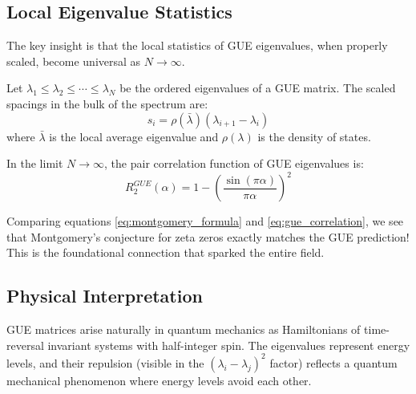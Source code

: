 \subsection{Local Eigenvalue Statistics}

The key insight is that the local statistics of GUE eigenvalues, when properly scaled, become universal as $N \to \infty$.

\begin{definition}
\label{def:scaled_spacings}
Let $\lambda_1 \leq \lambda_2 \leq \cdots \leq \lambda_N$ be the ordered eigenvalues of a GUE matrix. The scaled spacings in the bulk of the spectrum are:
\begin{equation}
s_i = \rho(\bar{\lambda}) (\lambda_{i+1} - \lambda_i)
\end{equation}
where $\bar{\lambda}$ is the local average eigenvalue and $\rho(\lambda)$ is the density of states.
\end{definition}

\begin{theorem}
\label{thm:gue_pair_correlation}
In the limit $N \to \infty$, the pair correlation function of GUE eigenvalues is:
\begin{equation}
R_2^{GUE}(\alpha) = 1 - \left(\frac{\sin(\pi \alpha)}{\pi \alpha}\right)^2
\label{eq:gue_correlation}
\end{equation}
\end{theorem}

\begin{highlight}
Comparing equations \eqref{eq:montgomery_formula} and \eqref{eq:gue_correlation}, we see that Montgomery's conjecture for zeta zeros exactly matches the GUE prediction! This is the foundational connection that sparked the entire field.
\end{highlight}

\subsection{Physical Interpretation}

\begin{remark}
GUE matrices arise naturally in quantum mechanics as Hamiltonians of time-reversal invariant systems with half-integer spin. The eigenvalues represent energy levels, and their repulsion (visible in the $(\lambda_i - \lambda_j)^2$ factor) reflects a quantum mechanical phenomenon where energy levels avoid each other.
\end{remark}

